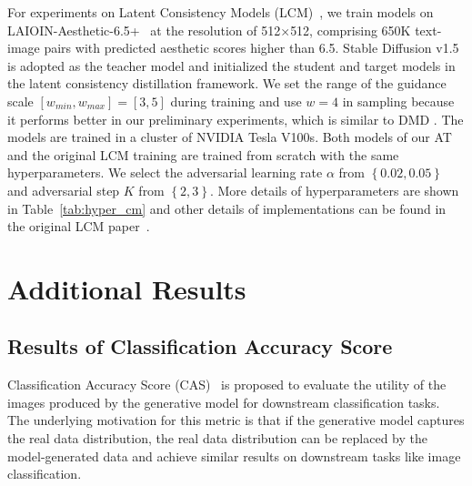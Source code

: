 For experiments on Latent Consistency Models (LCM)~\citep{luo2023latent}, we train models on LAIOIN-Aesthetic-6.5+~\citep{laion} 
at the resolution of 512$\times$512, comprising 650K text-image pairs with predicted aesthetic scores higher than 6.5.
Stable Diffusion v1.5~\citep{Rombach_2022_CVPR} is adopted as the teacher model and initialized the student and target models in the latent consistency distillation framework.
We set the range of the guidance scale $[w_{min}, w_{max}] = [3,5]$ during training and use $w = 4$ in sampling because it performs better in our preliminary experiments, which is similar to DMD \citep{yin2024onestep}.
The models are trained in a cluster of NVIDIA Tesla V100s.
Both models of our AT and the original LCM training are trained from scratch with the same hyperparameters.
We select the adversarial learning rate $\alpha$ from $\left\{0.02, 0.05\right\}$ and adversarial step $K$ from $\left\{2, 3\right\}$.
More details of hyperparameters are shown in Table~\ref{tab:hyper_cm} and other details of implementations can be found in the original LCM paper~\citep{luo2023latent}.




\section{Additional Results}

\subsection{Results of Classification Accuracy Score}\label{app:cas}



Classification Accuracy Score (CAS)~\citep{ravuri2019cas} is proposed to evaluate the utility of the images produced by the generative model for downstream classification tasks.
The underlying motivation for this metric is that if the generative model captures the real data distribution, the real data distribution can be replaced by the model-generated data and achieve similar results on downstream tasks like image classification.

